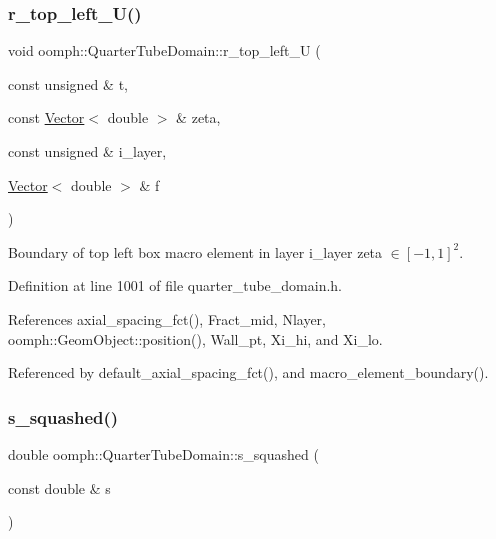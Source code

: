 \subsubsection{\texorpdfstring{r\+\_\+top\+\_\+left\+\_\+\+U()}{r\_top\_left\_U()}}
{\footnotesize\ttfamily void oomph\+::\+Quarter\+Tube\+Domain\+::r\+\_\+top\+\_\+left\+\_\+U (\begin{DoxyParamCaption}\item[{const unsigned \&}]{t,  }\item[{const \hyperlink{classoomph_1_1Vector}{Vector}$<$ double $>$ \&}]{zeta,  }\item[{const unsigned \&}]{i\+\_\+layer,  }\item[{\hyperlink{classoomph_1_1Vector}{Vector}$<$ double $>$ \&}]{f }\end{DoxyParamCaption})\hspace{0.3cm}{\ttfamily [private]}}



Boundary of top left box macro element in layer i\+\_\+layer zeta $ \in [-1,1]^2 $. 



Definition at line 1001 of file quarter\+\_\+tube\+\_\+domain.\+h.



References axial\+\_\+spacing\+\_\+fct(), Fract\+\_\+mid, Nlayer, oomph\+::\+Geom\+Object\+::position(), Wall\+\_\+pt, Xi\+\_\+hi, and Xi\+\_\+lo.



Referenced by default\+\_\+axial\+\_\+spacing\+\_\+fct(), and macro\+\_\+element\+\_\+boundary().

\mbox{\label{classoomph_1_1QuarterTubeDomain_a6ecbb8cd59208abef45384d7780853e1}} 
\subsubsection{\texorpdfstring{s\+\_\+squashed()}{s\_squashed()}}
{\footnotesize\ttfamily double oomph\+::\+Quarter\+Tube\+Domain\+::s\+\_\+squashed (\begin{DoxyParamCaption}\item[{const double \&}]{s }\end{DoxyParamCaption})\hspace{0.3cm}{\ttfamily [inline]}}




